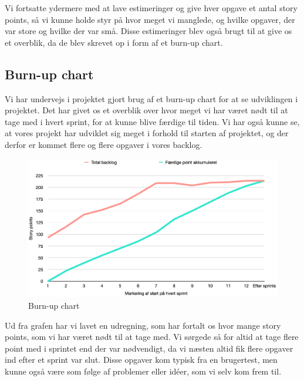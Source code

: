 Vi fortsatte ydermere med at lave estimeringer og give hver opgave et antal story points, så vi kunne holde styr på hvor meget vi manglede, og hvilke opgaver, der var store og hvilke der var små. Disse estimeringer blev også brugt til at give os et overblik, da de blev skrevet op i form af et burn-up chart.

\subsection{Burn-up chart}
Vi har undervejs i projektet gjort brug af et burn-up chart for at se udviklingen i projektet. Det har givet os et overblik over hvor meget vi har været nødt til at tage med i hvert sprint, for at kunne blive færdige til tiden. Vi har også kunne se, at vores projekt har udviklet sig meget i forhold til starten af projektet, og der derfor er kommet flere og flere opgaver i vores backlog.

\begin{figure}[H]
    \centering
    \includegraphics[width=1\textwidth]{img/burn-up-chart.png}
    \caption{Burn-up chart}
\end{figure}

Ud fra grafen har vi lavet en udregning, som har fortalt os hvor mange story points, som vi har været nødt til at tage med. Vi sørgede så for altid at tage flere point med i sprintet end der var nødvendigt, da vi næsten altid fik flere opgaver ind efter et sprint var slut. Disse opgaver kom typisk fra en brugertest, men kunne også være som følge af problemer eller idéer, som vi selv kom frem til.
